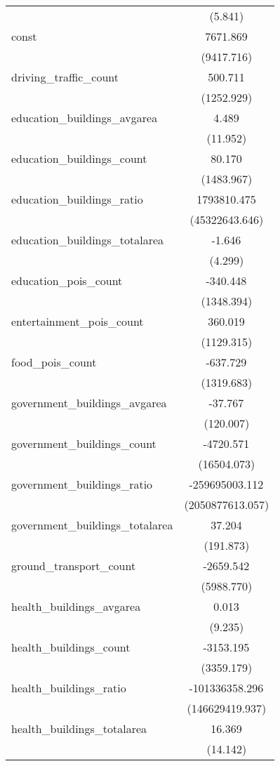 \begin{table}[!htbp]
\begin{tabular}{@{\extracolsep{5pt}}lc}
  & (5.841) \\
 const & 7671.869$^{}$ \\
  & (9417.716) \\
 driving_traffic_count & 500.711$^{}$ \\
  & (1252.929) \\
 education_buildings_avgarea & 4.489$^{}$ \\
  & (11.952) \\
 education_buildings_count & 80.170$^{}$ \\
  & (1483.967) \\
 education_buildings_ratio & 1793810.475$^{}$ \\
  & (45322643.646) \\
 education_buildings_totalarea & -1.646$^{}$ \\
  & (4.299) \\
 education_pois_count & -340.448$^{}$ \\
  & (1348.394) \\
 entertainment_pois_count & 360.019$^{}$ \\
  & (1129.315) \\
 food_pois_count & -637.729$^{}$ \\
  & (1319.683) \\
 government_buildings_avgarea & -37.767$^{}$ \\
  & (120.007) \\
 government_buildings_count & -4720.571$^{}$ \\
  & (16504.073) \\
 government_buildings_ratio & -259695003.112$^{}$ \\
  & (2050877613.057) \\
 government_buildings_totalarea & 37.204$^{}$ \\
  & (191.873) \\
 ground_transport_count & -2659.542$^{}$ \\
  & (5988.770) \\
 health_buildings_avgarea & 0.013$^{}$ \\
  & (9.235) \\
 health_buildings_count & -3153.195$^{}$ \\
  & (3359.179) \\
 health_buildings_ratio & -101336358.296$^{}$ \\
  & (146629419.937) \\
 health_buildings_totalarea & 16.369$^{}$ \\
  & (14.142) \\

\end{tabular}
\end{table}
